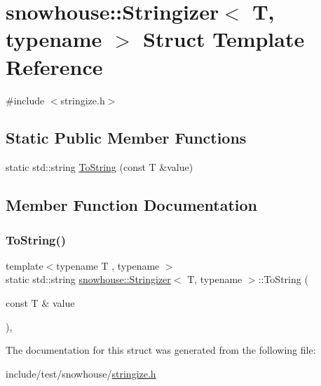 \hypertarget{structsnowhouse_1_1Stringizer}{}\section{snowhouse\+::Stringizer$<$ T, typename $>$ Struct Template Reference}
\label{structsnowhouse_1_1Stringizer}


{\ttfamily \#include $<$stringize.\+h$>$}

\subsection*{Static Public Member Functions}
\begin{DoxyCompactItemize}
\item 
static std\+::string \mbox{\hyperlink{structsnowhouse_1_1Stringizer_a5dd3d269fcde33d234b2c9704315f392}{To\+String}} (const T \&value)
\end{DoxyCompactItemize}


\subsection{Member Function Documentation}
\mbox{\label{structsnowhouse_1_1Stringizer_a5dd3d269fcde33d234b2c9704315f392}} 
\subsubsection{\texorpdfstring{ToString()}{ToString()}}
{\footnotesize\ttfamily template$<$typename T , typename $>$ \\
static std\+::string \mbox{\hyperlink{structsnowhouse_1_1Stringizer}{snowhouse\+::\+Stringizer}}$<$ T, typename $>$\+::To\+String (\begin{DoxyParamCaption}\item[{const T \&}]{value }\end{DoxyParamCaption})\hspace{0.3cm}{\ttfamily [inline]}, {\ttfamily [static]}}



The documentation for this struct was generated from the following file\+:\begin{DoxyCompactItemize}
\item 
include/test/snowhouse/\mbox{\hyperlink{stringize_8h}{stringize.\+h}}\end{DoxyCompactItemize}
